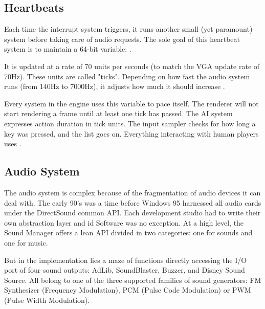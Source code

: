 \subsection{Heartbeats}
Each time the interrupt system triggers, it runs another small (yet paramount) system before taking care of audio requests. The sole goal of this heartbeat system is to maintain a 64-bit variable: .\\
\par
\begin{minipage}{\textwidth}

\end{minipage}
\par
It is updated at a rate of 70 units per seconds (to match the VGA update rate of 70Hz). These units are called "ticks". Depending on how fast the audio system runs (from 140Hz to 7000Hz), it adjusts how much it should increase .\\
\par
Every system in the engine uses this variable to pace itself. The renderer will not start rendering a frame until at least one tick has passed. The AI system expresses action duration in tick units. The input sampler checks for how long a key was pressed, and the list goes on. Everything interacting with human players uses .\\













\subsection{Audio System}
The audio system is complex because of the fragmentation of audio devices it can deal with. The early 90's was a time before Windows 95 harnessed all audio cards under the DirectSound common API. Each development studio had to write their own abstraction layer and id Software was no exception. At a high level, the Sound Manager offers a lean API divided in two categories: one for sounds and one for music.\\
\par
\begin{minipage}{\textwidth}

\end{minipage}
\par
\begin{minipage}{\textwidth}

\end{minipage}
\par
\vspace{10pt}
But in the implementation lies a maze of functions directly accessing the I/O port of four sound outputs: AdLib, SoundBlaster, Buzzer, and Disney Sound Source. All belong to one of the three supported families of sound generators: FM Synthesizer (Frequency Modulation), PCM (Pulse Code Modulation) or PWM (Pulse Width Modulation).\\


